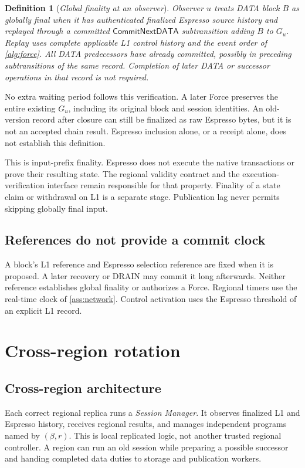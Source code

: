 \documentclass[11pt,a4paper]{article}
\newcommand{\tagg}[1]{\ensuremath{\mathsf{#1}}}
\newcommand{\defterm}[1]{\textcolor{rrBlue}{\textit{#1}}}
\newtheorem{definition}{Definition}[section]
\newcounter{protocol}
\begin{document}
\begin{definition}[\defterm{Global finality at an observer}]
\label{def:global-finality}
Observer $u$ treats DATA block $B$ as globally final when it has
authenticated finalized Espresso source history and replayed through a
committed $\tagg{CommitNextDATA}$ subtransition adding $B$ to $G_u$.
Replay uses complete applicable L1 control history and the event order
of \cref{alg:force}. All DATA predecessors have already committed,
possibly in preceding subtransitions of the same record. Completion of
later DATA or successor operations in that record is not required.
\end{definition}

No extra waiting period follows this verification. A later Force
preserves the entire existing $G_u$, including its original block and
session identities. An old-version record after closure can still be
finalized as raw Espresso bytes, but it is not an accepted chain result.
Espresso inclusion alone, or a receipt alone, does not establish this
definition.

This is input-prefix finality. Espresso does not execute the native
transactions or prove their resulting state. The regional validity
contract and the execution-verification interface remain responsible
for that property. Finality of a state claim or withdrawal on L1 is a
separate stage. Publication lag never permits skipping globally final
input.

\subsection{References do not provide a commit clock}
\label{sec:late-receipt}
A block's L1 reference and Espresso selection reference are fixed when
it is proposed. A later recovery or DRAIN may commit it long afterwards.
Neither reference establishes global finality or authorizes a Force.
Regional timers use the real-time clock of \cref{ass:network}.
Control activation uses the Espresso threshold of an explicit L1 record.

\section{Cross-region rotation}
\label{sec:xprotocols}

\subsection{Cross-region architecture}
\label{sec:runtime-modules}
Each correct regional replica runs a \defterm{Session Manager}.
It observes finalized L1 and Espresso history, receives regional results,
and manages independent programs named by $(\beta,r)$.
This is local replicated logic, not another trusted regional controller.
A region can run an old session while preparing a possible successor
and handing completed data duties to storage and publication workers.
\end{document}
